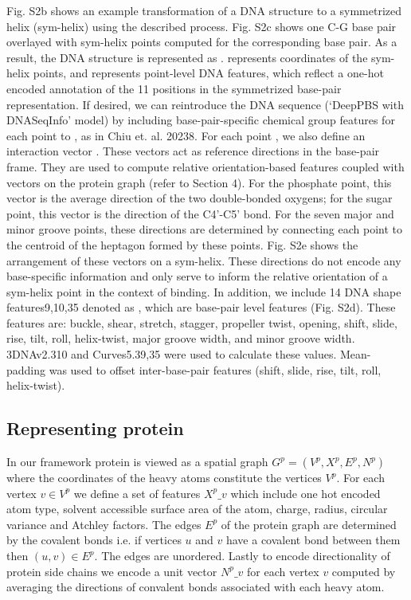 Fig. S2b shows an example transformation of a DNA structure to a symmetrized helix (sym-helix) using the described process. Fig. S2c shows one C-G base pair overlayed with sym-helix points computed for the corresponding base pair. As a result, the DNA structure is represented as .  represents coordinates of the sym-helix points, and  represents point-level DNA features, which reflect a one-hot encoded annotation of the 11 positions in the symmetrized base-pair representation. If desired, we can reintroduce the DNA sequence (`DeepPBS with DNASeqInfo' model) by including base-pair-specific chemical group features for each point to , as in Chiu et. al. 20238. For each point , we also define an interaction vector . These vectors act as reference directions in the base-pair frame. They are used to compute relative orientation-based features coupled with vectors  on the protein graph (refer to Section 4). For the phosphate point, this vector is the average direction of the two double-bonded oxygens; for the sugar point, this vector is the direction of the C4'-C5' bond. For the seven major and minor groove points, these directions are determined by connecting each point to the centroid of the heptagon formed by these points. Fig. S2e shows the arrangement of these vectors on a sym-helix. These directions do not encode any base-specific information and only serve to inform the relative orientation of a sym-helix point in the context of binding. In addition, we include 14 DNA shape features9,10,35 denoted as , which are base-pair level features (Fig. S2d). These features are: buckle, shear, stretch, stagger, propeller twist, opening, shift, slide, rise, tilt, roll, helix-twist, major groove width, and minor groove width. 3DNAv2.310 and Curves5.39,35 were used to calculate these values. Mean-padding was used to offset inter-base-pair features (shift, slide, rise, tilt, roll, helix-twist).

\subsection{Representing protein}

In our framework protein is viewed as a spatial graph $G^p = (V^p, X^p, E^p, N^p)$  where the
coordinates of the heavy atoms constitute the vertices $V^p$. For each vertex $v \in V^p$  we define
a set of features $X^p\_v$ which include one hot encoded atom type, solvent accessible surface area
of the atom, charge, radius, circular variance and Atchley factors. The edges $E^p$ of the protein
graph  are determined by the covalent bonds i.e. if  vertices $u$ and $v$ have
a covalent bond between them then $(u,v) \in E^p$. The edges are unordered. Lastly to encode
directionality of protein side chains we encode a unit vector $N^p\_v$ for each vertex $v$ computed by
averaging the directions of convalent bonds associated with each heavy atom. 

